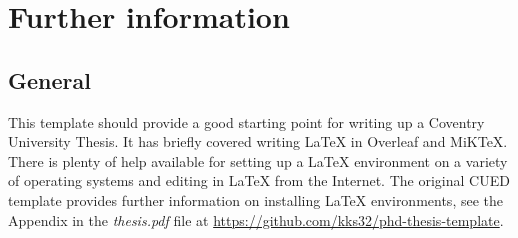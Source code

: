 \chapter{Further information}

\section*{General}

This template should provide a good starting point for writing up a Coventry University Thesis. It has briefly covered writing \LaTeX{} in Overleaf and MiKTeX. There is plenty of help available for setting up a \LaTeX{} environment on a variety of operating systems and editing in \LaTeX{} from the Internet. The original CUED template provides further information on installing \LaTeX{} environments, see the Appendix in the \textit{thesis.pdf} file at \url{https://github.com/kks32/phd-thesis-template}.

